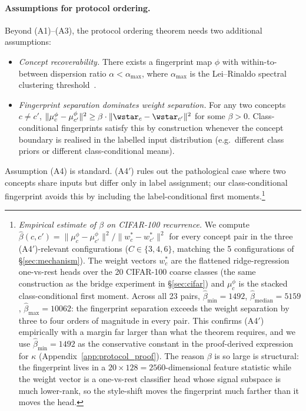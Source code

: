 \paragraph{Assumptions for protocol ordering.}
Beyond (A1)--(A3), the protocol ordering theorem needs two additional assumptions:
\begin{itemize}[leftmargin=1.4em,topsep=2pt,itemsep=2pt]
\item[(A4)] \emph{Concept recoverability.} There exists a fingerprint map $\phi$ with within-to-between dispersion ratio $\alpha < \alpha_{\max}$, where $\alpha_{\max}$ is the Lei--Rinaldo spectral clustering threshold~\citep{lei2015consistency}.
\item[(A4$'$)] \emph{Fingerprint separation dominates weight separation.} For any two concepts $c \ne c'$, $\|\mu_c^\phi - \mu_{c'}^\phi\|^2 \ge \beta \cdot \|\wstar_c - \wstar_{c'}\|^2$ for some $\beta > 0$. Class-conditional fingerprints satisfy this by construction whenever the concept boundary is realised in the labelled input distribution (e.g.\ different class priors or different class-conditional means).
\end{itemize}
Assumption (A4) is standard. (A4$'$) rules out the pathological case where two concepts share inputs but differ only in label assignment; our class-conditional fingerprint avoids this by including the label-conditional first moments.\footnote{\emph{Empirical estimate of $\beta$ on CIFAR-100 recurrence.} We compute $\widehat\beta(c,c') = \|\mu_c^\phi - \mu_{c'}^\phi\|^2 / \|w^*_c - w^*_{c'}\|^2$ for every concept pair in the three (A4$'$)-relevant configurations ($C \in \{3, 4, 6\}$, matching the 5 configurations of \S\ref{sec:mechanism}). The weight vectors $w^*_c$ are the flattened ridge-regression one-vs-rest heads over the 20 CIFAR-100 coarse classes (the same construction as the bridge experiment in \S\ref{sec:cifar}) and $\mu_c^\phi$ is the stacked class-conditional first moment. Across all 23 pairs, $\widehat\beta_{\min} = 1492$, $\widehat\beta_{\mathrm{median}} = 5159$, $\widehat\beta_{\max} = 10062$: the fingerprint separation exceeds the weight separation by three to four orders of magnitude in every pair. This confirms (A4$'$) empirically with a margin far larger than what the theorem requires, and we use $\widehat\beta_{\min} = 1492$ as the conservative constant in the proof-derived expression for $\kappa$ (Appendix~\ref{app:protocol_proof}). The reason $\beta$ is so large is structural: the fingerprint lives in a $20 \times 128 = 2560$-dimensional feature statistic while the weight vector is a one-vs-rest classifier head whose signal subspace is much lower-rank, so the style-shift moves the fingerprint much farther than it moves the head.}

